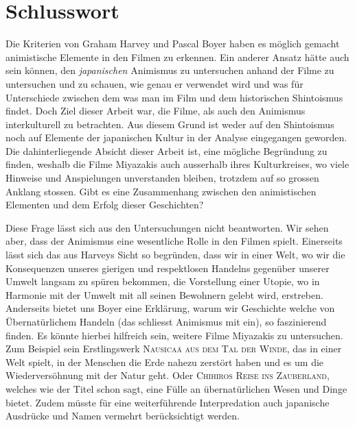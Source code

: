 \section*{Schlusswort}
Die Kriterien von Graham Harvey und Pascal Boyer haben es möglich gemacht animistische Elemente in den Filmen zu erkennen. Ein anderer Ansatz hätte auch sein können, den \emph{japanischen} Animismus zu untersuchen anhand der Filme zu untersuchen und zu schauen, wie genau er verwendet wird und was für Unterschiede zwischen dem was man im Film und dem historischen Shintoismus findet. Doch Ziel dieser Arbeit war, die Filme, als auch den Animismus interkulturell zu betrachten. Aus diesem Grund ist weder auf den Shintoismus noch auf Elemente der japanischen Kultur in der Analyse eingegangen geworden. Die dahinterliegende Absicht dieser Arbeit ist, eine mögliche Begründung zu finden, weshalb die Filme Miyazakis auch ausserhalb ihres Kulturkreises, wo viele Hinweise und Anspielungen unverstanden bleiben, trotzdem auf so grossen Anklang stossen. Gibt es eine Zusammenhang zwischen den animistischen Elementen und dem Erfolg dieser Geschichten?

Diese Frage lässt sich aus den Untersuchungen nicht beantworten. Wir sehen aber, dass der Animismus eine wesentliche Rolle in den Filmen spielt. Einerseits lässt sich das aus Harveys Sicht so begründen, dass wir in einer Welt, wo wir die Konsequenzen unseres gierigen und respektlosen Handelns gegenüber unserer Umwelt langsam zu spüren bekommen, die Vorstellung einer Utopie, wo in Harmonie mit der Umwelt mit all seinen Bewohnern gelebt wird, erstreben. Anderseits bietet uns Boyer eine Erklärung, warum wir Geschichte welche von Übernatürlichem Handeln (das schliesst Animismus mit ein), so faszinierend finden. Es könnte hierbei hilfreich sein, weitere Filme Miyazakis zu untersuchen. Zum Beispiel sein Erstlingswerk \textsc{Nausicaä aus dem Tal der Winde}, das in einer Welt spielt, in der Menschen die Erde nahezu zerstört haben und es um die Wiederversöhnung mit der Natur geht. Oder \textsc{Chihiros Reise ins Zauberland}, welches wie der Titel schon sagt, eine Fülle an übernatürlichen Wesen und Dinge bietet. Zudem müsste für eine weiterführende Interpredation auch japanische Ausdrücke und Namen vermehrt berücksichtigt werden.